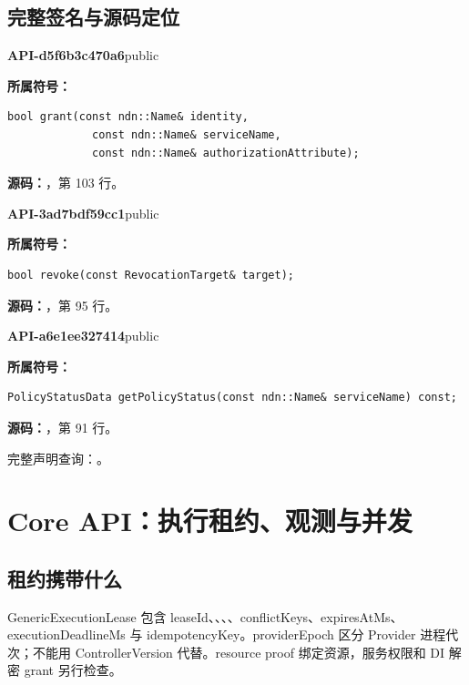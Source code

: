 \subsection{完整签名与源码定位}

\textbf{API-d5f6b3c470a6}\quad public\par
\textbf{所属符号：}\par
\begin{Verbatim}[fontsize=\footnotesize,breaklines,breakanywhere]
bool grant(const ndn::Name& identity,
             const ndn::Name& serviceName,
             const ndn::Name& authorizationAttribute);
\end{Verbatim}
\textbf{源码：}，第 103 行。\par

\textbf{API-3ad7bdf59cc1}\quad public\par
\textbf{所属符号：}\par
\begin{Verbatim}[fontsize=\footnotesize,breaklines,breakanywhere]
bool revoke(const RevocationTarget& target);
\end{Verbatim}
\textbf{源码：}，第 95 行。\par

\textbf{API-a6e1ee327414}\quad public\par
\textbf{所属符号：}\par
\begin{Verbatim}[fontsize=\footnotesize,breaklines,breakanywhere]
PolicyStatusData getPolicyStatus(const ndn::Name& serviceName) const;
\end{Verbatim}
\textbf{源码：}，第 91 行。\par

完整声明查询：。

\section{Core API：执行租约、观测与并发}

\subsection{租约携带什么}
GenericExecutionLease 包含 leaseId、、、、conflictKeys、expiresAtMs、executionDeadlineMs 与 idempotencyKey。providerEpoch 区分 Provider 进程代次；不能用 ControllerVersion 代替。resource proof 绑定资源，服务权限和 DI 解密 grant 另行检查。

